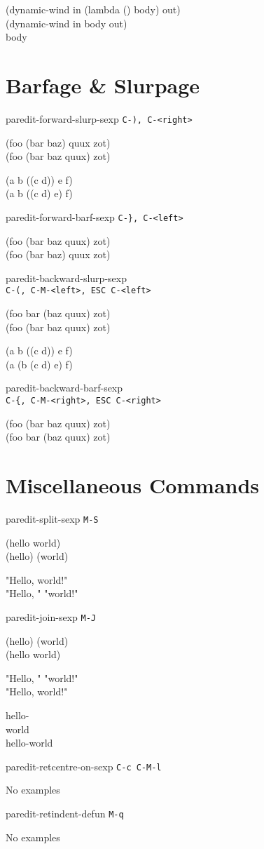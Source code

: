 \documentclass[10pt,landscape,a4paper]{article}
\begin{document}
\begin{multicols}{4}
{\ttfamily
(dynamic-wind in (lambda () \cursor body) out)\\
(dynamic-wind in \cursor body out)\\
\cursor body
}

    \section*{\large{Barfage \& Slurpage}}

paredit-forward-slurp-sexp \texttt{C-), C-<right>}

{\ttfamily
(foo (bar \cursor baz) quux zot)\\
(foo (bar \cursor baz quux) zot)

(a b ((c\cursor{} d)) e f)\\
(a b ((c\cursor{} d) e) f)
}

paredit-forward-barf-sexp \texttt{C-\}, C-<left>}

{\ttfamily
(foo (bar \cursor baz quux) zot)\\
(foo (bar \cursor baz) quux zot)
}

paredit-backward-slurp-sexp \\\texttt{C-(, C-M-<left>, ESC C-<left>}

{\ttfamily
(foo bar (baz\cursor{} quux) zot)\\
(foo (bar\cursor{} baz quux) zot)

(a b ((c\cursor{} d)) e f)\\
(a (b (c\cursor{} d) e) f)
}

paredit-backward-barf-sexp \\\texttt{C-\{, C-M-<right>, ESC C-<right>}

{\ttfamily
(foo (bar baz \cursor quux) zot)\\
(foo bar (baz \cursor quux) zot)
}

    \section*{\large{Miscellaneous Commands}}

paredit-split-sexp \texttt{M-S}

{\ttfamily
(hello\cursor{} world)\\
(hello)\cursor{} (world)

"Hello, \cursor world!"\\
"Hello, "\cursor{} "world!"
}

paredit-join-sexp \texttt{M-J}

{\ttfamily
(hello)\cursor{} (world)\\
(hello\cursor{} world)

"Hello, "\cursor{} "world!"\\
"Hello, \cursor world!"

hello-\\
\cursor \space \space world\\
hello-\cursor world
}

paredit-retcentre-on-sexp \texttt{C-c C-M-l}

{\ttfamily
No examples
}

paredit-retindent-defun \texttt{M-q}

{\ttfamily
No examples
}

  \end{multicols}
\end{document}

